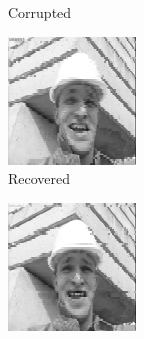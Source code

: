 \begin{figure}
\begin{subfigure}{0.4\textwidth}
    \caption{Corrupted}
  \end{subfigure}
  \begin{subfigure}{0.4\textwidth}
    \centering
    \includegraphics[width=.9\textwidth]{Chapter7/Images/foreman40_rec_18.png}
    \caption{Recovered}
  \end{subfigure}
  \begin{subfigure}{0.4\textwidth}
    \centering
    \includegraphics[width=.9\textwidth]{Chapter7/Images/foreman40_rec_22.png}

\end{subfigure}
\end{figure}
